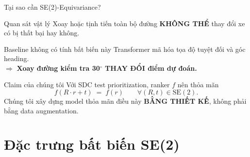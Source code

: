 \documentclass[aspectratio=169,10pt]{beamer}
\begin{document}
\begin{frame}{Tại sao cần SE(2)-Equivariance?}
\begin{block}{Quan sát vật lý}
\scriptsize
Xoay hoặc tịnh tiến toàn bộ đường \textbf{KHÔNG THỂ} thay đổi xe có bị thất bại hay không.
\end{block}

\begin{exampleblock}{Baseline không có tính bất biến này}
\scriptsize
Transformer mã hóa tọa độ tuyệt đối và góc heading.\\
$\Rightarrow$ \textbf{Xoay đường kiểm tra 30$^\circ$ THAY ĐỔI điểm dự đoán.}
\end{exampleblock}

\begin{block}{Claim của chúng tôi}
\scriptsize
Với SDC test prioritization, ranker $f$ nên thỏa mãn
\[
  f(R \cdot r + t) \;=\; f(r) \qquad \forall (R, t) \in \mathrm{SE}(2).
\]
Chúng tôi xây dựng model thỏa mãn điều này \textbf{BẰNG THIẾT KẾ}, không phải bằng data augmentation.
\end{block}
\end{frame}

\section{Đặc trưng bất biến SE(2)}
\end{document}

